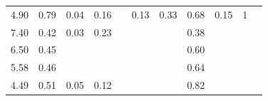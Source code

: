 \begin{refsection}[referencesCh3]
\begin{table}
\begin{adjustbox}{scale=0.65,center}
\begin{tabular}{@{}ccccccccccc@{}}
		4.90                                                         & 0.79                                                & 0.04                                                & 0.16                                                &                                                     & 0.13                                                 & 0.33                                                & 0.68                                                  & 0.15                                                    & 1                                                    & \cite{WRAP}                                                                              \\
		7.40                                                         & 0.42                                                & 0.03                                                & 0.23                                                &                                                     &                                                      &                                                     & 0.38                                                  &                                                         &                                                      & \cite{ADAS}            \\
		6.50                                                         & 0.45                                                &                                                     &                                                     &                                                     &                                                      &                                                     & 0.60                                                  &                                                         &                                                      & \cite{ADAS}            \\
		5.58                                                         & 0.46                                                &                                                     &                                                     &                                                     &                                                      &                                                     & 0.64                                                  &                                                         &                                                      & \cite{ADAS}            \\
		4.49                                                         & 0.51                                                & 0.05                                                & 0.12                                                &                                                     &                                                      &                                                     & 0.82                                                  &                                                         &                                                      & \cite{ADAS}            \\

\end{tabular}
\end{adjustbox}
\end{table}
\end{refsection}
